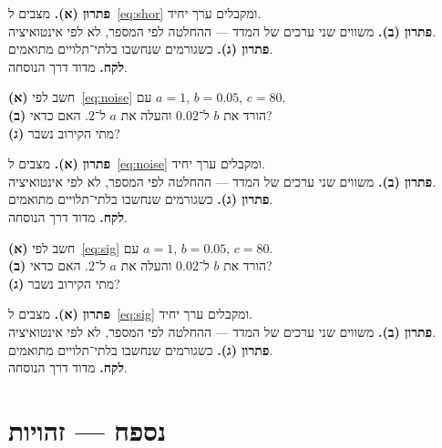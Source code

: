\begin{keybox}[frametitle={פתרון 18},nobreak=true]
\textbf{פתרון (א).} מצבים ל~\eqref{eq:shor} ומקבלים ערך יחיד.\\[2pt]
\textbf{פתרון (ב).} משווים שני ערכים של המדד — ההחלטה לפי המספר, לא לפי אינטואיציה.\\[2pt]
\textbf{פתרון (ג).} כשגורמים שנחשבו בלתי־תלויים מתואמים.\\[2pt]
\textbf{לקח.} מדוד דרך הנוסחה.
\end{keybox}


\begin{exbox}[frametitle={תרגיל 19 — \en{depolarizing}}]
\textbf{(א)} חשב לפי~\eqref{eq:noise} עם $a=1$, $b=0.05$, $c=80$.\\[3pt]
\textbf{(ב)} הורד את $b$ ל־$0.02$ והעלה את $a$ ל־$2$. האם כדאי?\\[3pt]
\textbf{(ג)} מתי הקירוב נשבר?
\end{exbox}

\begin{keybox}[frametitle={פתרון 19},nobreak=true]
\textbf{פתרון (א).} מצבים ל~\eqref{eq:noise} ומקבלים ערך יחיד.\\[2pt]
\textbf{פתרון (ב).} משווים שני ערכים של המדד — ההחלטה לפי המספר, לא לפי אינטואיציה.\\[2pt]
\textbf{פתרון (ג).} כשגורמים שנחשבו בלתי־תלויים מתואמים.\\[2pt]
\textbf{לקח.} מדוד דרך הנוסחה.
\end{keybox}


\begin{exbox}[frametitle={תרגיל 20 — \en{verify}}]
\textbf{(א)} חשב לפי~\eqref{eq:sig} עם $a=1$, $b=0.05$, $c=80$.\\[3pt]
\textbf{(ב)} הורד את $b$ ל־$0.02$ והעלה את $a$ ל־$2$. האם כדאי?\\[3pt]
\textbf{(ג)} מתי הקירוב נשבר?
\end{exbox}

\begin{keybox}[frametitle={פתרון 20},nobreak=true]
\textbf{פתרון (א).} מצבים ל~\eqref{eq:sig} ומקבלים ערך יחיד.\\[2pt]
\textbf{פתרון (ב).} משווים שני ערכים של המדד — ההחלטה לפי המספר, לא לפי אינטואיציה.\\[2pt]
\textbf{פתרון (ג).} כשגורמים שנחשבו בלתי־תלויים מתואמים.\\[2pt]
\textbf{לקח.} מדוד דרך הנוסחה.
\end{keybox}


\chapter{נספח — זהויות}
\label{ch:appendix}

